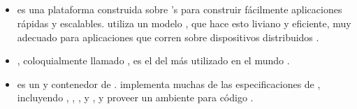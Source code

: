 \subsection{\serverSideAS}

	\subsubsection{\webserverINT \softwarePC }
		\begin{itemize}
			\item 
				\textbf{\nodejsNAME} es una plataforma construida sobre \chrome's \javaScriptNAME \runtimeCPT para construir fácilmente aplicaciones \networkINT rápidas y escalables. \nodejsNAME utiliza un modelo \eventdrivenPL, \nonbloking  {} que hace esto liviano y eficiente, muy adecuado para aplicaciones \dataintensive \realTimeINT que corren sobre dispositivos distribuidos \cite{technology_nodejs}.
			
			\item
				\textbf{\apacheNAME \httpNAME \serverAS }, coloquialmente llamado \apacheNAME, es el \softwarePC del \serverAS \webINT más utilizado en el mundo \cite{online_technology_apache}.
			
			\item
				\textbf{\apacheNAME \tomcatNAME }	es un \webserverINT y contenedor de \servletNAME  \openSourcePC. \tomcatNAME implementa muchas de las especificaciones de \javaeeNAME, incluyendo \javaNAME \servletNAME, \javaspNAME, \javaelNAME, y \websocketINT, y proveer un ambiente \webserverINT \httpNAME para código \javaNAME \runInCPT \cite{online_technology_officialsite_tomcat}.
		\end{itemize}

